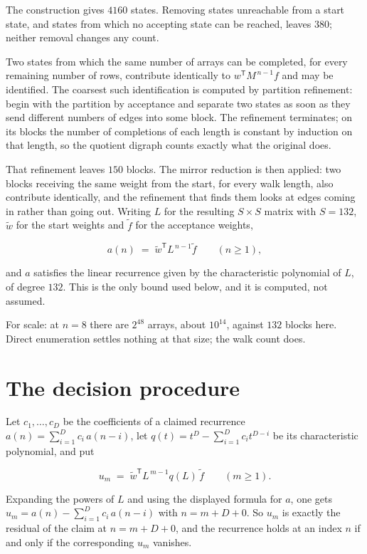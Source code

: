\documentclass[11pt]{article}
\theoremstyle{definition}
\begin{document}
The construction gives $4160$ states. Removing states unreachable from a start state, and states from which no accepting state can be reached, leaves $380$; neither removal changes any count.

Two states from which the same number of arrays can be completed, for every remaining number of rows, contribute identically to $w^{\mathsf T}M^{\,n-1}f$ and may be identified. The coarsest such identification is computed by partition refinement: begin with the partition by acceptance and separate two states as soon as they send different numbers of edges into some block. The refinement terminates; on its blocks the number of completions of each length is constant by induction on that length, so the quotient digraph counts exactly what the original does.

That refinement leaves $150$ blocks. The mirror reduction is then applied: two blocks receiving the same weight from the start, for every walk length, also contribute identically, and the refinement that finds them looks at edges coming in rather than going out. Writing $L$ for the resulting $S \times S$ matrix with $S = 132$, $\tilde w$ for the start weights and $\tilde f$ for the acceptance weights,

\[a(n) \;=\; \tilde w^{\mathsf T} L^{\,n-1} \tilde f \qquad (n \ge 1),\]

and $a$ satisfies the linear recurrence given by the characteristic polynomial of $L$, of degree $132$. This is the only bound used below, and it is computed, not assumed.

For scale: at $n = 8$ there are $2^{48}$ arrays, about $10^{14}$, against $132$ blocks here. Direct enumeration settles nothing at that size; the walk count does.

\section{The decision procedure}

Let $c_1,\dots,c_D$ be the coefficients of a claimed recurrence $a(n) = \sum_{i=1}^{D} c_i\,a(n-i)$, let $q(t) = t^{D} - \sum_{i=1}^{D} c_i t^{D-i}$ be its characteristic polynomial, and put

\[u_m \;=\; \tilde w^{\mathsf T} L^{\,m-1} q(L)\,\tilde f \qquad (m \ge 1).\]

Expanding the powers of $L$ and using the displayed formula for $a$, one gets $u_m = a(n) - \sum_{i=1}^{D} c_i\,a(n-i)$ with $n = m + D + 0$. So $u_m$ is exactly the residual of the claim at $n = m + D + 0$, and the recurrence holds at an index $n$ if and only if the corresponding $u_m$ vanishes.
\end{document}
